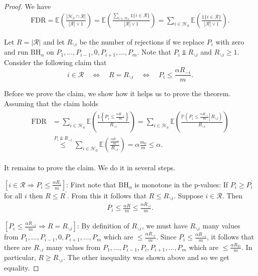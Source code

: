 \begin{proof}
    We have
\begin{align*}
\mathrm{FDR}=\mathbb{E}\left(\frac{\left|\mathcal{H}_0 \cap \mathcal{R}\right|}{|\mathcal{R}| \vee 1}\right)=\mathbb{E}\left(\frac{\sum_{i \in \mathcal{H}_0} \mathbb{1}\{i \in \mathcal{R}\}}{|\mathcal{R}| \vee 1}\right)=\sum_{i \in \mathcal{H}_0} \mathbb{E}\left(\frac{\mathbb{1}\{i \in \mathcal{R}\}}{|\mathcal{R}| \vee 1}\right) .
\end{align*}


Let $R=|\mathcal{R}|$ and let $R_{\backslash i}$ be the number of rejections if we replace $P_i$ with zero and run $\mathrm{BH}_\alpha$ on $P_1, \ldots, P_{i-1}, 0, P_{i+1}, \ldots, P_m$. Note that $P_i \Perp R_{\backslash i}$ and $R_{\backslash i} \geq 1$. Consider the following claim that
$$i \in \mathcal{R} \quad \Leftrightarrow \quad R=R_{\backslash i} \quad \Leftrightarrow \quad P_i \leq \frac{\alpha R_{-i}}{m}.$$

Before we prove the claim, we show how it helps us to prove the theorem. Assuming that the claim holds
\begin{align*}
\begin{aligned}
\mathrm{FDR} & =\sum_{i \in \mathcal{H}_0} \mathbb{E}\left(\frac{\mathbb{1}\left\{P_i \leq \frac{\alpha R_{-i}}{m}\right\}}{R_{\backslash i}}\right)=\sum_{i \in \mathcal{H}_0} \mathbb{E}\left(\frac{\mathbb{P}\left(\left.P_i \leq \frac{\alpha R_{-i}}{m} \right\rvert\, R_{\backslash i}\right)}{R_{\backslash i}}\right) \\
& \stackrel{P_i \Perp R_{-i}}{\leq} \sum_{i \in \mathcal{H}_0} \mathbb{E}\left(\frac{\frac{\alpha R_{-i}}{m}}{R_{\backslash i}}\right)=\alpha \frac{m_0}{m} \leq \alpha .
\end{aligned}
\end{align*}


It remains to prove the claim. We do it in several steps.

$\left[i \in \mathcal{R} \Rightarrow P_i \leq \frac{\alpha R_i}{m}\right]$: First note that $\mathrm{BH}_\alpha$ is monotone in the p-values: If $P_i \geq P_i^{\prime}$ for all $i$ then $R \leq R^{\prime}$. From this it follows that $R \leq R_{\backslash i}$. Suppose $i \in \mathcal{R}$. Then
\begin{align*}
P_i \leq \frac{\alpha R}{m} \leq \frac{\alpha R_{\backslash i}}{m} .
\end{align*}

$\left[P_i \leq \frac{\alpha R_{-i}}{m} \Rightarrow R=R_{\backslash i}\right]$: By definition of $R_{\backslash i}$, we must have $R_{\backslash i}$ many values from $P_1, \ldots, P_{i-1}, 0, P_{i+1}, \ldots, P_m$ which are $\leq \frac{\alpha R_{\backslash i}}{m}$. Since $P_i \leq \frac{\alpha R_{-i}}{m}$, it follows that there are $R_{\backslash i}$ many values from $P_1, \ldots, P_{i-1}, P_i, P_{i+1}, \ldots, P_m$ which are $\leq \frac{\alpha R_{V i}}{m}$. In particular, $R \geq R_{\backslash i}$. The other inequality was shown above and so we get equality.


\end{proof}
